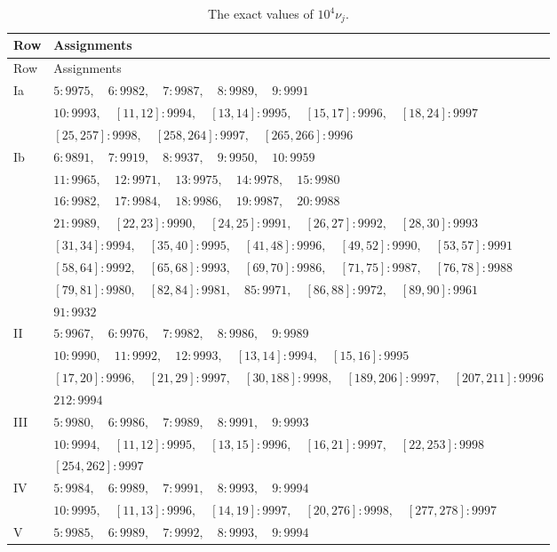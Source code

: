 \documentclass[11pt,reqno]{amsart}
\numberwithin{equation}{section}
\theoremstyle{definition}
\theoremstyle{remark}
\begin{document}
\begin{longtable}{@{}lp{}@{}}
\caption{The exact values of $10^4\nu_j$.}\label{bc:nu-table}\\
\toprule Row&Assignments\\\midrule\endfirsthead
\toprule Row&Assignments\\\midrule\endhead
Ia & $5:9975,\quad 6:9982,\quad 7:9987,\quad 8:9989,\quad 9:9991$\\
 & $10:9993,\quad [11,12]:9994,\quad [13,14]:9995,\quad [15,17]:9996,\quad [18,24]:9997$\\
 & $[25,257]:9998,\quad [258,264]:9997,\quad [265,266]:9996$\\
Ib & $6:9891,\quad 7:9919,\quad 8:9937,\quad 9:9950,\quad 10:9959$\\
 & $11:9965,\quad 12:9971,\quad 13:9975,\quad 14:9978,\quad 15:9980$\\
 & $16:9982,\quad 17:9984,\quad 18:9986,\quad 19:9987,\quad 20:9988$\\
 & $21:9989,\quad [22,23]:9990,\quad [24,25]:9991,\quad [26,27]:9992,\quad [28,30]:9993$\\
 & $[31,34]:9994,\quad [35,40]:9995,\quad [41,48]:9996,\quad [49,52]:9990,\quad [53,57]:9991$\\
 & $[58,64]:9992,\quad [65,68]:9993,\quad [69,70]:9986,\quad [71,75]:9987,\quad [76,78]:9988$\\
 & $[79,81]:9980,\quad [82,84]:9981,\quad 85:9971,\quad [86,88]:9972,\quad [89,90]:9961$\\
 & $91:9932$\\
II & $5:9967,\quad 6:9976,\quad 7:9982,\quad 8:9986,\quad 9:9989$\\
 & $10:9990,\quad 11:9992,\quad 12:9993,\quad [13,14]:9994,\quad [15,16]:9995$\\
 & $[17,20]:9996,\quad [21,29]:9997,\quad [30,188]:9998,\quad [189,206]:9997,\quad [207,211]:9996$\\
 & $212:9994$\\
III & $5:9980,\quad 6:9986,\quad 7:9989,\quad 8:9991,\quad 9:9993$\\
 & $10:9994,\quad [11,12]:9995,\quad [13,15]:9996,\quad [16,21]:9997,\quad [22,253]:9998$\\
 & $[254,262]:9997$\\
IV & $5:9984,\quad 6:9989,\quad 7:9991,\quad 8:9993,\quad 9:9994$\\
 & $10:9995,\quad [11,13]:9996,\quad [14,19]:9997,\quad [20,276]:9998,\quad [277,278]:9997$\\
V & $5:9985,\quad 6:9989,\quad 7:9992,\quad 8:9993,\quad 9:9994$\\

\end{longtable}
\end{document}
